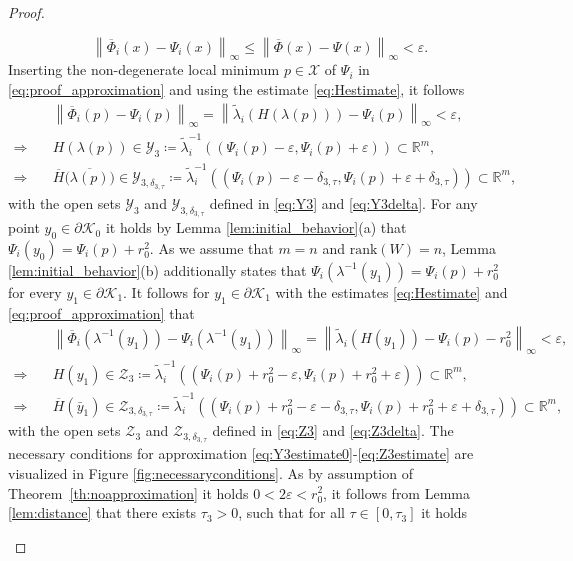 \documentclass[10pt]{article}
\numberwithin{equation}{section}
\newcommand{\eps}{\varepsilon}
\newcommand\norm[1]{\left\lVert#1\right\rVert}
\begin{document}
\begin{proof}
\begin{enumerate}
			\begin{equation} \label{eq:proof_approximation}
				\norm{\overline{\Phi}_i(x) - \Psi_i(x)}_\infty \leq \norm{\overline{\Phi}(x) - \Psi(x)}_\infty < \eps. 
			\end{equation}
			Inserting the non-degenerate local minimum $p \in \mathcal{X}$ of $\Psi_i$ in \eqref{eq:proof_approximation} and using the estimate \eqref{eq:Hestimate}, it follows
			\begin{align}
				&\norm{\overline{\Phi}_i(p) - \Psi_i(p)}_\infty = \norm{\tilde\lambda_i(H(\lambda(p)))-\Psi_i(p)}_\infty < \eps, \nonumber\\
				\Rightarrow \quad & H(\lambda(p)) \in \mathcal{Y}_3 \coloneqq \tilde{\lambda}^{-1}_i\left((\Psi_i(p)-\eps,\Psi_i(p)+\eps)\right) \subset \mathbb{R}^m, \label{eq:Y3estimate0}\\	
				\Rightarrow \quad & \overline{H}\big(\overline{\lambda(p)}\big) \in \mathcal{Y}_{3,\delta_{3,\tau}} \coloneqq \tilde{\lambda}^{-1}_i\left((\Psi_i(p)-\eps-\delta_{3,\tau},\Psi_i(p)+\eps+\delta_{3,\tau})\right) \subset \mathbb{R}^m, \label{eq:Y3estimate}
			\end{align}
			with the open sets $\mathcal{Y}_3$ and $\mathcal{Y}_{3,\delta_{3,\tau}}$ defined in \eqref{eq:Y3} and \eqref{eq:Y3delta}. For any point $y_0 \in \partial \mathcal{K}_0$ it holds by Lemma \ref{lem:initial_behavior}(a) that $\Psi_i(y_0) = \Psi_i(p) + r_0^2$. As we assume that $m = n$ and $\text{rank}(W) = n$, Lemma \ref{lem:initial_behavior}(b) additionally states that $\Psi_i(\lambda^{-1}(y_1)) = \Psi_i(p) + r_0^2$ for every $y_1 \in \partial \mathcal{K}_1$. It follows for $y_1 \in \partial \mathcal{K}_1$ with the estimates \eqref{eq:Hestimate} and \eqref{eq:proof_approximation} that 
			\begin{align}
				&\norm{\overline{\Phi}_i(\lambda^{-1}(y_1)) - \Psi_i(\lambda^{-1}(y_1))}_\infty = \norm{\tilde\lambda_i(H(y_1))-\Psi_i(p)-r_0^2}_\infty < \eps, \nonumber\\
				\Rightarrow \quad & H(y_1) \in \mathcal{Z}_3 \coloneqq \tilde{\lambda}^{-1}_i\left((\Psi_i(p)+r_0^2-\eps,\Psi_i(p)+r_0^2+\eps)\right) \subset \mathbb{R}^m, \label{eq:Z3estimate0}\\	
				\Rightarrow \quad & \overline{H}(\bar{y}_1) \in \mathcal{Z}_{3,\delta_{3,\tau}} \coloneqq \tilde{\lambda}^{-1}_i\left((\Psi_i(p)+r_0^2-\eps-\delta_{3,\tau},\Psi_i(p)+r_0^2+\eps+\delta_{3,\tau})\right) \subset \mathbb{R}^m, \label{eq:Z3estimate}
			\end{align}
			with the open sets $\mathcal{Z}_3$ and $\mathcal{Z}_{3,\delta_{3,\tau}}$ defined in \eqref{eq:Z3} and \eqref{eq:Z3delta}. The necessary conditions for approximation  \eqref{eq:Y3estimate0}-\eqref{eq:Z3estimate} are visualized in Figure \ref{fig:necessaryconditions}. As by assumption of Theorem~\ref{th:noapproximation} it holds $0<2\eps<r_0^2$, it follows from Lemma \ref{lem:distance} that there exists $\tau_3>0$, such that for all $\tau\in [0,\tau_3]$ it holds	

\end{enumerate}
\end{proof}
\end{document}
